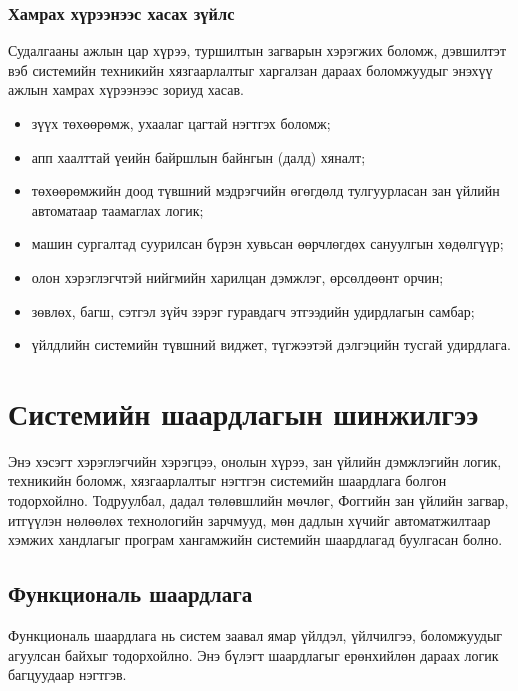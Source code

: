 \subsubsection*{Хамрах хүрээнээс хасах зүйлс}

Судалгааны ажлын цар хүрээ, туршилтын загварын хэрэгжих боломж, дэвшилтэт вэб системийн техникийн хязгаарлалтыг харгалзан дараах боломжуудыг энэхүү ажлын хамрах хүрээнээс зориуд хасав.

\begin{itemize}
    \item зүүх төхөөрөмж, ухаалаг цагтай нэгтгэх боломж;
    \item апп хаалттай үеийн байршлын байнгын (далд) хяналт;
    \item төхөөрөмжийн доод түвшний мэдрэгчийн өгөгдөлд тулгуурласан зан үйлийн автоматаар таамаглах логик;
    \item машин сургалтад суурилсан бүрэн хувьсан өөрчлөгдөх сануулгын хөдөлгүүр;
    \item олон хэрэглэгчтэй нийгмийн харилцан дэмжлэг, өрсөлдөөнт орчин;
    \item зөвлөх, багш, сэтгэл зүйч зэрэг гуравдагч этгээдийн удирдлагын самбар;
    \item үйлдлийн системийн түвшний виджет, түгжээтэй дэлгэцийн тусгай удирдлага.
\end{itemize}

\section{Системийн шаардлагын шинжилгээ}

Энэ хэсэгт хэрэглэгчийн хэрэгцээ, онолын хүрээ, зан үйлийн дэмжлэгийн логик, техникийн боломж, хязгаарлалтыг нэгтгэн системийн шаардлага болгон тодорхойлно. Тодруулбал, дадал төлөвшлийн мөчлөг, Фоггийн зан үйлийн загвар, итгүүлэн нөлөөлөх технологийн зарчмууд, мөн дадлын хүчийг автоматжилтаар хэмжих хандлагыг програм хангамжийн системийн шаардлагад буулгасан болно.

\subsection{Функциональ шаардлага}

Функциональ шаардлага нь систем заавал ямар үйлдэл, үйлчилгээ, боломжуудыг агуулсан байхыг тодорхойлно. Энэ бүлэгт шаардлагыг ерөнхийлөн дараах логик багцуудаар нэгтгэв.

